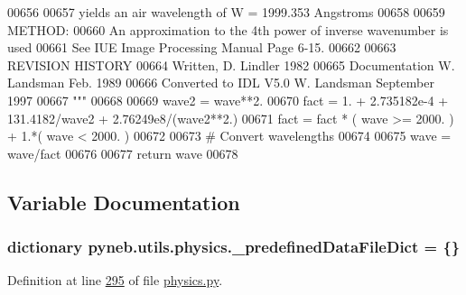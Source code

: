 \begin{DoxyCode}
00656 \textcolor{stringliteral}{}
00657 \textcolor{stringliteral}{yields an air wavelength of W = 1999.353 Angstroms}
00658 \textcolor{stringliteral}{}
00659 \textcolor{stringliteral}{METHOD:}
00660 \textcolor{stringliteral}{An approximation to the 4th power of inverse wavenumber is used}
00661 \textcolor{stringliteral}{See IUE Image Processing Manual Page 6-15.}
00662 \textcolor{stringliteral}{}
00663 \textcolor{stringliteral}{REVISION HISTORY}
00664 \textcolor{stringliteral}{Written, D. Lindler 1982}
00665 \textcolor{stringliteral}{Documentation W. Landsman Feb. 1989}
00666 \textcolor{stringliteral}{Converted to IDL V5.0 W. Landsman September 1997}
00667 \textcolor{stringliteral}{    """}
00668 
00669     wave2 = wave**2.
00670     fact = 1. + 2.735182e-4 + 131.4182/wave2 + 2.76249e8/(wave2**2.)
00671     fact = fact * ( wave >= 2000. ) + 1.*( wave < 2000. )
00672     
00673     \textcolor{comment}{# Convert wavelengths}
00674     
00675     wave = wave/fact
00676     
00677     \textcolor{keywordflow}{return} wave
00678 
\end{DoxyCode}


\subsection{Variable Documentation}
\hypertarget{namespacepyneb_1_1utils_1_1physics_a07a026669fde4152bdb02f243cc4f4d4}{
\subsubsection[{\-\_\-predefined\-Data\-File\-Dict}]{\setlength{\rightskip}{0pt plus 5cm}dictionary pyneb.\-utils.\-physics.\-\_\-predefined\-Data\-File\-Dict = \{\}}}\label{namespacepyneb_1_1utils_1_1physics_a07a026669fde4152bdb02f243cc4f4d4}


Definition at line \hyperlink{physics_8py_source_l00295}{295} of file \hyperlink{physics_8py_source}{physics.\-py}.

